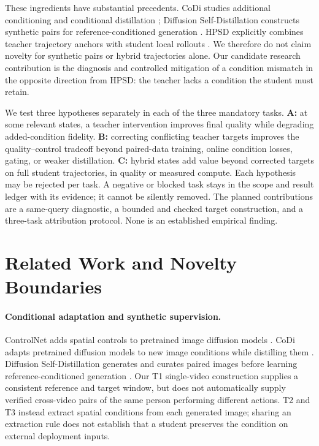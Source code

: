 \documentclass{article}
\begin{document}
These ingredients have substantial precedents. CoDi studies additional conditioning and conditional distillation \cite{codi}; Diffusion Self-Distillation constructs synthetic pairs for reference-conditioned generation \cite{dsd}. HPSD explicitly combines teacher trajectory anchors with student local rollouts \cite{hpsd}. We therefore do not claim novelty for synthetic pairs or hybrid trajectories alone. Our candidate research contribution is the diagnosis and controlled mitigation of a condition mismatch in the opposite direction from HPSD: the teacher lacks a condition the student must retain.

We test three hypotheses separately in each of the three mandatory tasks. \textbf{A:} at some relevant states, a teacher intervention improves final quality while degrading added-condition fidelity. \textbf{B:} correcting conflicting teacher targets improves the quality--control tradeoff beyond paired-data training, online condition losses, gating, or weaker distillation. \textbf{C:} hybrid states add value beyond corrected targets on full student trajectories, in quality or measured compute. Each hypothesis may be rejected per task. A negative or blocked task stays in the scope and result ledger with its evidence; it cannot be silently removed. The planned contributions are a same-query diagnostic, a bounded and checked target construction, and a three-task attribution protocol. None is an established empirical finding.

\section{Related Work and Novelty Boundaries}
\paragraph{Conditional adaptation and synthetic supervision.}
ControlNet adds spatial controls to pretrained image diffusion models \cite{controlnet}. CoDi adapts pretrained diffusion models to new image conditions while distilling them \cite{codi}. Diffusion Self-Distillation generates and curates paired images before learning reference-conditioned generation \cite{dsd}. Our T1 single-video construction supplies a consistent reference and target window, but does not automatically supply verified cross-video pairs of the same person performing different actions. T2 and T3 instead extract spatial conditions from each generated image; sharing an extraction rule does not establish that a student preserves the condition on external deployment inputs.
\end{document}
